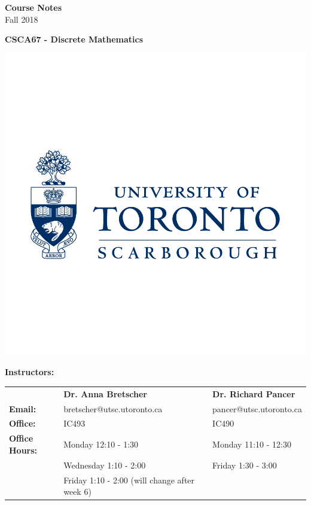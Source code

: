 \documentclass{article}
\begin{document}
\begin{titlepage}
\begin{center}
  \vspace{5cm}



  \Large {\textbf{Course Notes}}\\

  \Large {Fall 2018}

  \hrulefill
  \vspace{0.3cm}

  \textbf{\huge CSCA67 - Discrete Mathematics}

  \hrulefill

  \vspace{0.5cm}

  \includegraphics[scale = 0.25]{UTSC}

  \vspace{6cm}

  \end{center}

  \textbf{Instructors:}

  \begin{center}

  \begin{tabular}{lll}
   &\textbf{Dr. Anna Bretscher}&\textbf{Dr. Richard Pancer}\\
  \textbf{Email:} & bretscher@utsc.utoronto.ca & pancer@utsc.utoronto.ca\\
  \textbf{Office:} & IC493 & IC490\\
  \textbf{Office Hours:}& Monday 12:10 - 1:30 & Monday 11:10 - 12:30\\
   & Wednesday 1:10 - 2:00 & Friday 1:30 - 3:00\\
   & Friday 1:10 - 2:00 (will change after week 6)&
  \end{tabular}

  \end{center}

\end{titlepage}
\pagestyle{fancy}
\end{document}
